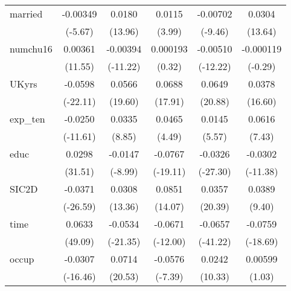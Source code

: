 \begin{table}[htbp]
\begin{tabular}{l*{5}{c}}
married     &    -0.00349\sym{***}&      0.0180\sym{***}&      0.0115\sym{***}&    -0.00702\sym{***}&      0.0304\sym{***}\\
            &     (-5.67)         &     (13.96)         &      (3.99)         &     (-9.46)         &     (13.64)         \\
numchu16    &     0.00361\sym{***}&    -0.00394\sym{***}&    0.000193         &    -0.00510\sym{***}&   -0.000119         \\
            &     (11.55)         &    (-11.22)         &      (0.32)         &    (-12.22)         &     (-0.29)         \\
UKyrs       &     -0.0598\sym{***}&      0.0566\sym{***}&      0.0688\sym{***}&      0.0649\sym{***}&      0.0378\sym{***}\\
            &    (-22.11)         &     (19.60)         &     (17.91)         &     (20.88)         &     (16.60)         \\
exp\_ten     &     -0.0250\sym{***}&      0.0335\sym{***}&      0.0465\sym{***}&      0.0145\sym{***}&      0.0616\sym{***}\\
            &    (-11.61)         &      (8.85)         &      (4.49)         &      (5.57)         &      (7.43)         \\
educ        &      0.0298\sym{***}&     -0.0147\sym{***}&     -0.0767\sym{***}&     -0.0326\sym{***}&     -0.0302\sym{***}\\
            &     (31.51)         &     (-8.99)         &    (-19.11)         &    (-27.30)         &    (-11.38)         \\
SIC2D       &     -0.0371\sym{***}&      0.0308\sym{***}&      0.0851\sym{***}&      0.0357\sym{***}&      0.0389\sym{***}\\
            &    (-26.59)         &     (13.36)         &     (14.07)         &     (20.39)         &      (9.40)         \\
time        &      0.0633\sym{***}&     -0.0534\sym{***}&     -0.0671\sym{***}&     -0.0657\sym{***}&     -0.0759\sym{***}\\
            &     (49.09)         &    (-21.35)         &    (-12.00)         &    (-41.22)         &    (-18.69)         \\
occup       &     -0.0307\sym{***}&      0.0714\sym{***}&     -0.0576\sym{***}&      0.0242\sym{***}&     0.00599         \\
            &    (-16.46)         &     (20.53)         &     (-7.39)         &     (10.33)         &      (1.03)         \\

\end{tabular}
\end{table}

